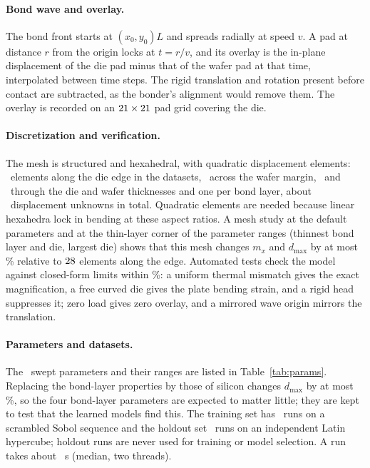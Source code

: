 \documentclass[11pt]{article}
\begin{document}
\paragraph{Bond wave and overlay.} The bond front starts at $(x_0,y_0)L$ and spreads radially at speed $v$. A pad at
distance $r$ from the origin locks at $t=r/v$, and its overlay is the in-plane displacement of the die pad minus that of
the wafer pad at that time, interpolated between time steps. The rigid translation and rotation present before contact
are subtracted, as the bonder's alignment would remove them. The overlay is recorded on an $21\times21$ pad grid
covering the die.

\paragraph{Discretization and verification.} The mesh is structured and hexahedral, with quadratic displacement
elements: \MeshCoarse~elements along the die edge in the datasets, \NRing~across the wafer margin, \NzDie~and
\NzWafer~through the die and wafer thicknesses and one per bond layer, about \DofsCoarse~displacement unknowns in total.
Quadratic elements are needed because linear hexahedra lock in bending at these aspect ratios. A mesh study at the
default parameters and at the thin-layer corner of the parameter ranges (thinnest bond layer and die, largest die)
shows that this mesh changes $m_x$ and $d_{\max}$ by at most \ConvCoarsePct\% relative to
$28$ elements along the edge. Automated tests check the model against closed-form limits within
\VerifTolPct\%: a uniform thermal mismatch gives the exact magnification, a free curved die gives the plate bending
strain, and a rigid head suppresses it; zero load gives zero overlay, and a mirrored wave origin mirrors the translation.

\paragraph{Parameters and datasets.} The \NParams~swept parameters and their ranges are listed in
Table~\ref{tab:params}. Replacing the bond-layer properties by those of silicon changes $d_{\max}$ by at most
\BondLayerEffectPct\%, so the four bond-layer parameters are expected to matter little; they are kept to test that the
learned models find this. The training set has \NTrainRuns~runs on a scrambled Sobol sequence and the holdout set
\NHoldoutRuns~runs on an independent Latin hypercube; holdout runs are never used for training or model selection. A
run takes about \RunTimeMedianS~s (median, two threads).
\end{document}
